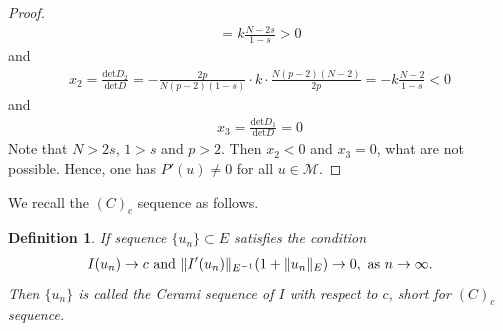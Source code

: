 \documentclass[12pt,a4paper,reqno]{amsart}
\numberwithin{equation}{section}
\newtheorem{definition}{Definition}[section]
\begin{document}
\begin{proof}
\begin{equation*}
\begin{aligned}
=
k\frac{N-2s}{1-s}>0
\end{aligned}
\end{equation*}
and
\begin{equation*}
\begin{aligned}
x_{2}=\frac{\mathrm{det} D_{2}}{\mathrm{det} D}
=
-
\frac{2p}{N(p-2)(1-s)}\cdot
k\cdot
\frac{N(p-2)(N-2)}{2p}
=
-k\frac{N-2}{1-s}<0
\end{aligned}
\end{equation*}
and
\begin{equation*}
\begin{aligned}
x_{3}=\frac{\mathrm{det} D_{1}}{\mathrm{det} D}
=
0
\end{aligned}
\end{equation*}
Note that $N>2s$, $1>s$ and $p>2$. Then $x_{2}<0$ and $x_{3}=0$,  what are not possible.
Hence, one has $P'(u)\not=0$ for all $u\in \mathcal{M}$.
\end{proof}



We recall the $(C)_{c}$  sequence as follows.
\begin{definition}
If sequence $\{u_{n}\}\subset E$ satisfies the condition
\begin{equation*}
\begin{aligned}
I(u_{n})\rightarrow c
~\mathrm{and}~\|I'(u_{n})\|_{E^{-1}}(1+\|u_{n}\|_{E})\rightarrow 0,
~{\rm as}~n\to\infty.
\end{aligned}
\end{equation*}
Then $\{u_{n}\}$ is called the Cerami sequence of $I$ with respect to $c$, short for $(C)_{c}$ sequence.
\end{definition}
\end{document}
